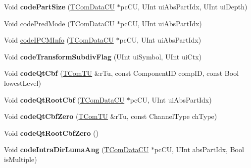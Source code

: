 \begin{DoxyCompactItemize}
\mbox{\label{class_t_enc_sbac_a2f59e69791502178ab21f1f0a049cb1f}} 
Void {\bfseries code\+Part\+Size} (\hyperlink{class_t_com_data_c_u}{T\+Com\+Data\+CU} $\ast$pc\+CU, U\+Int ui\+Abs\+Part\+Idx, U\+Int ui\+Depth)
\item 
Void \hyperlink{class_t_enc_sbac_a26ec0b34abb4bc05f6b784b6d8556fc4}{code\+Pred\+Mode} (\hyperlink{class_t_com_data_c_u}{T\+Com\+Data\+CU} $\ast$pc\+CU, U\+Int ui\+Abs\+Part\+Idx)
\item 
Void \hyperlink{class_t_enc_sbac_a3fd9e3057ad1215862ea0716e6e12349}{code\+I\+P\+C\+M\+Info} (\hyperlink{class_t_com_data_c_u}{T\+Com\+Data\+CU} $\ast$pc\+CU, U\+Int ui\+Abs\+Part\+Idx)
\item 
\mbox{\label{class_t_enc_sbac_ae340dd7f423bf71fa5c4a5c9acce1290}} 
Void {\bfseries code\+Transform\+Subdiv\+Flag} (U\+Int ui\+Symbol, U\+Int ui\+Ctx)
\item 
\mbox{\label{class_t_enc_sbac_af0f3c5bd9b894f3fb41000ea20db3f25}} 
Void {\bfseries code\+Qt\+Cbf} (\hyperlink{class_t_com_t_u}{T\+Com\+TU} \&r\+Tu, const Component\+ID comp\+ID, const Bool lowest\+Level)
\item 
\mbox{\label{class_t_enc_sbac_a39c6d05abab152292815ac73b10d5e2e}} 
Void {\bfseries code\+Qt\+Root\+Cbf} (\hyperlink{class_t_com_data_c_u}{T\+Com\+Data\+CU} $\ast$pc\+CU, U\+Int ui\+Abs\+Part\+Idx)
\item 
\mbox{\label{class_t_enc_sbac_a99f365a54bb0d1bffa80f82e57401740}} 
Void {\bfseries code\+Qt\+Cbf\+Zero} (\hyperlink{class_t_com_t_u}{T\+Com\+TU} \&r\+Tu, const Channel\+Type ch\+Type)
\item 
\mbox{\label{class_t_enc_sbac_ab0abe902e03d36d33ea1d9ca12404a49}} 
Void {\bfseries code\+Qt\+Root\+Cbf\+Zero} ()
\item 
\mbox{\label{class_t_enc_sbac_a180e207d67d729c8e61195abb292f072}} 
Void {\bfseries code\+Intra\+Dir\+Luma\+Ang} (\hyperlink{class_t_com_data_c_u}{T\+Com\+Data\+CU} $\ast$pc\+CU, U\+Int abs\+Part\+Idx, Bool is\+Multiple)
\item 
\mbox{\label{class_t_enc_sbac_afc4e0608818b40f9fdb39ba8b389f4db}} 

\end{DoxyCompactItemize}
